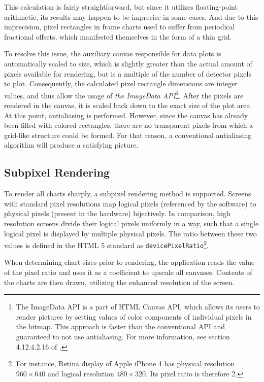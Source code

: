 This calculation is fairly straightforward, but since it utilizes floating-point arithmetic, its results may happen to be imprecise in some cases. And due to this imprecision, pixel rectangles in frame charts used to suffer from periodical fractional offsets, which manifested themselves in the form of a thin grid.

To resolve this issue, the auxiliary canvas responsible for data plots is automatically scaled to size, which is slightly greater than the actual amount of pixels available for rendering, but is a multiple of the number of detector pixels to plot. Consequently, the calculated pixel rectangle dimensions are integer values, and thus allow the usage of \textit{the ImageData API}\footnote{The ImageData API is a part of HTML Canvas API, which allows its users to render pictures by setting values of color components of individual pixels in the bitmap. This approach is faster than the conventional API and guaranteed to not use antialiasing. For more information, see section 4.12.4.2.16 of \cite{HtmlStandard}.}. After the pixels are rendered in the canvas, it is scaled back down to the exact size of the plot area. At this point, antialiasing is performed. However, since the canvas has already been filled with colored rectangles, there are no transparent pixels from which a grid-like structure could be formed. For that reason, a conventional antialiasing algorithm will produce a satisfying picture.

\subsection{Subpixel Rendering}
To render all charts sharply, a subpixel rendering method is supported. Screens with standard pixel resolutions map logical pixels (referenced by the software) to physical pixels (present in the hardware) bijectively. In comparison, high resolution screens divide their logical pixels uniformly in a way, such that a single logical pixel is displayed by multiple physical pixels. The ratio between these two values is defined in the HTML 5 standard \cite{HtmlStandard} as \texttt{devicePixelRatio}\footnote{For instance, Retina display of Apple iPhone 4 has physical resolution $960\times 640$ and logical resolution $480\times 320$. Its pixel ratio is therefore 2.}.

When determining chart sizes prior to rendering, the application reads the value of the pixel ratio and uses it as a coefficient to upscale all canvases. Contents of the charts are then drawn, utilizing the enhanced resolution of the screen.

